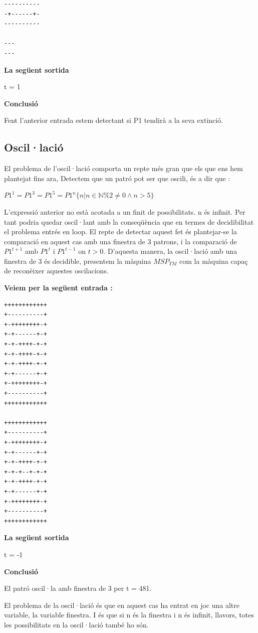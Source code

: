 \documentclass[12pt,a4paper]{report}
\def \tm{$MSP_{TM} $}
\begin{document}
\begin{lstlisting}
----------
-+------+-
----------

---
---
\end{lstlisting}

\textbf{La següent sortida}

t = 1

\textbf{Conclusió}

Fent l’anterior entrada estem detectant si P1 tendirà a la seva extinció. 

\subsection{Oscil·lació}

El problema de l’oscil·lació comporta un repte més gran que els que ens hem plantejat fins ara, Detectem que un patró pot ser que oscili, és a dir que : 

\begin{center}
$P1^1 = P1^3 = P1^5 = P1^n \{ n | n \in \mathbb{N} \% 2 \neq 0 \wedge n > 5 \} $
\end{center}

L’expressió anterior no està acotada a un finit de possibilitats. n és infinit. Per tant podria quedar oscil·lant amb la conseqüència que en termes de decidibilitat el problema entrés en loop. El repte de detectar aquest fet és plantejar-se la comparació en aquest cas amb una finestra de 3 patrons, i la comparació de $P1^{t+1}$ amb $P1^t$ i $P1^{t-1}$ on $t > 0$. D’aquesta manera, la oscil·lació amb una finestra de 3 és decidible, presentem la màquina \tm{} com la màquina capaç de reconèixer aquestes oscilacions. 

\textbf{Veiem per la següent entrada :}

\begin{lstlisting}
++++++++++++
+----------+
+-++++++++-+
+-+------+-+
+-+-++++-+-+
+-+-++++-+-+
+-+-++++-+-+
+-+------+-+
+-++++++++-+
+----------+
++++++++++++

++++++++++++
+----------+
+-++++++++-+
+-+------+-+
+-+-++++-+-+
+-+-+--+-+-+
+-+-++++-+-+
+-+------+-+
+-++++++++-+
+----------+
++++++++++++
\end{lstlisting}

\textbf{La següent sortida}

t = -1

\textbf{Conclusió}

El patró oscil·la amb finestra de 3 per t = 481.


El problema de la oscil·lació és que en aquest cas ha entrat en joc una altre variable, la variable finestra. I és que si n és la finestra i n és infinit, llavors, totes les possibilitats en la oscil·lació també ho són. 
\end{document}
